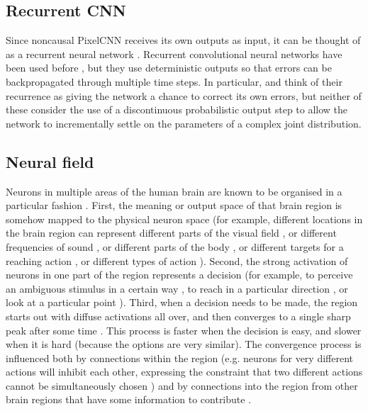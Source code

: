 \documentclass[11pt, a4paper, openany]{book}
\begin{document}
\subsection{Recurrent CNN}

Since noncausal PixelCNN receives its own outputs as input, it can be thought of as a recurrent neural network \citep{rnn}. Recurrent convolutional neural networks have been used before \citep{rcnnlabel,rcnnobject,rcnnreinforcement,rcnnsaliency,crfrcnn}, but they use deterministic outputs so that errors can be backpropagated through multiple time steps. In particular, \citet{rcnnlabel} and \citet{rcnnsaliency} think of their recurrence as giving the network a chance to correct its own errors, but neither of these consider the use of a discontinuous probabilistic output step to allow the network to incrementally settle on the parameters of a complex joint distribution.

\subsection{Neural field} \label{neuralfields}

Neurons in multiple areas of the human brain are known to be organised in a particular fashion \citep{douglas2004neuronal}. First, the meaning or output space of that brain region is somehow mapped to the physical neuron space \citep{erlhagen1999distribution,douglas2004neuronal} (for example, different locations in the brain region can represent different parts of the visual field \citep{ellias1975pattern}, or different frequencies of sound \citep{romani1982tonotopic}, or different parts of the body \citep{nakamura1998somatosensory}, or different targets for a reaching action \citep{erlhagen1999distribution,cisek2010neural}, or different types of action \citep{cisek2007cortical}). Second, the strong activation of neurons in one part of the region represents a decision \citep{amari1977dynamics,erlhagen1999distribution,cisek2007cortical} (for example, to perceive an ambiguous stimulus in a certain way \citep{kleinschmidt1998human}, to reach in a particular direction \citep{erlhagen1999distribution,cisek2010neural}, or look at a particular point \citep{kopecz1995saccadic}). Third, when a decision needs to be made, the region starts out with diffuse activations all over, and then converges to a single sharp peak after some time \citep{amari1977dynamics,erlhagen1999distribution,brincat2006dynamic}. This process is faster when the decision is easy, and slower when it is hard \citep{decisions1} (because the options are very similar). The convergence process is influenced both by connections within the region (e.g. neurons for very different actions will inhibit each other, expressing the constraint that two different actions cannot be simultaneously chosen \citep{redgrave1999basal}) and by connections into the region from other brain regions that have some information to contribute \citep{redgrave1999basal}.
\end{document}
